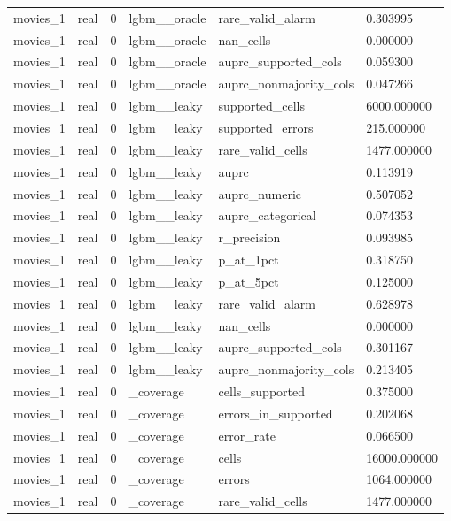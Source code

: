 \begin{tabular}{llllll}
movies\_1 & real & 0 & lgbm\_\_oracle & rare\_valid\_alarm & 0.303995 \\
movies\_1 & real & 0 & lgbm\_\_oracle & nan\_cells & 0.000000 \\
movies\_1 & real & 0 & lgbm\_\_oracle & auprc\_supported\_cols & 0.059300 \\
movies\_1 & real & 0 & lgbm\_\_oracle & auprc\_nonmajority\_cols & 0.047266 \\
movies\_1 & real & 0 & lgbm\_\_leaky & supported\_cells & 6000.000000 \\
movies\_1 & real & 0 & lgbm\_\_leaky & supported\_errors & 215.000000 \\
movies\_1 & real & 0 & lgbm\_\_leaky & rare\_valid\_cells & 1477.000000 \\
movies\_1 & real & 0 & lgbm\_\_leaky & auprc & 0.113919 \\
movies\_1 & real & 0 & lgbm\_\_leaky & auprc\_numeric & 0.507052 \\
movies\_1 & real & 0 & lgbm\_\_leaky & auprc\_categorical & 0.074353 \\
movies\_1 & real & 0 & lgbm\_\_leaky & r\_precision & 0.093985 \\
movies\_1 & real & 0 & lgbm\_\_leaky & p\_at\_1pct & 0.318750 \\
movies\_1 & real & 0 & lgbm\_\_leaky & p\_at\_5pct & 0.125000 \\
movies\_1 & real & 0 & lgbm\_\_leaky & rare\_valid\_alarm & 0.628978 \\
movies\_1 & real & 0 & lgbm\_\_leaky & nan\_cells & 0.000000 \\
movies\_1 & real & 0 & lgbm\_\_leaky & auprc\_supported\_cols & 0.301167 \\
movies\_1 & real & 0 & lgbm\_\_leaky & auprc\_nonmajority\_cols & 0.213405 \\
movies\_1 & real & 0 & \_coverage & cells\_supported & 0.375000 \\
movies\_1 & real & 0 & \_coverage & errors\_in\_supported & 0.202068 \\
movies\_1 & real & 0 & \_coverage & error\_rate & 0.066500 \\
movies\_1 & real & 0 & \_coverage & cells & 16000.000000 \\
movies\_1 & real & 0 & \_coverage & errors & 1064.000000 \\
movies\_1 & real & 0 & \_coverage & rare\_valid\_cells & 1477.000000 \\
\hline
\end{tabular}
